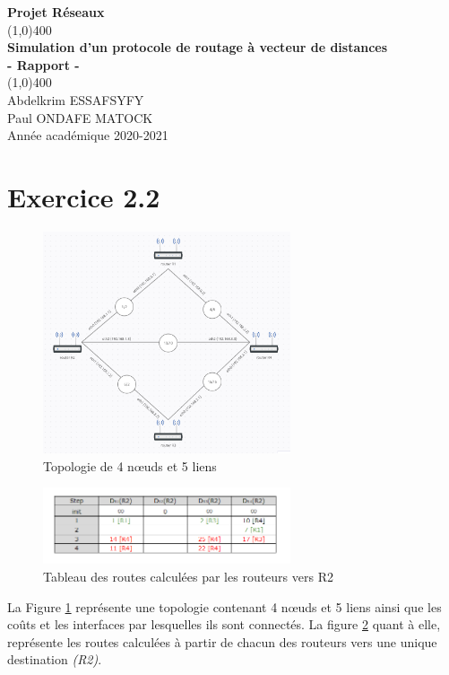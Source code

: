 \documentclass[11pt]{article}
\begin{document}
\begin{titlepage}
\begin{center}
\vspace*{1cm}
\Large{\textbf{Projet Réseaux}}\\
\vfill
\line(1,0){400}\\[1mm]
\huge{\textbf{Simulation d'un protocole de routage à vecteur de distances}}\\[3mm]
\Large{\textbf{- Rapport -}}\\[1mm]
\line(1,0){400}\\
\vfill
Abdelkrim ESSAFSYFY\\
Paul ONDAFE MATOCK\\
Année académique 2020-2021
\end{center}
\end{titlepage}

\tableofcontents
\thispagestyle{empty}
\clearpage
\setcounter{page}{1}

\section{Exercice 2.2}
\begin{figure} [h!]
\centering
  \includegraphics[width=0.65\textwidth]{../documents/topology-figure.png}
  \caption{Topologie de 4 nœuds et 5 liens}
   \label{fig:topology}
\end{figure}
\begin{figure} [h!]
\centering
  \includegraphics[width=0.65\textwidth]{../documents/demo-table.png}
  \caption{Tableau des routes calculées par les routeurs vers R2}
   \label{fig:table}
\end{figure}
La Figure \ref{fig:topology} représente une topologie contenant 4 nœuds et 5 liens ainsi que les coûts et les interfaces par lesquelles ils sont connectés. La figure \ref{fig:table} quant à elle, représente les routes calculées à partir de chacun des routeurs vers une unique destination \textit{(R2)}.
\end{document}
